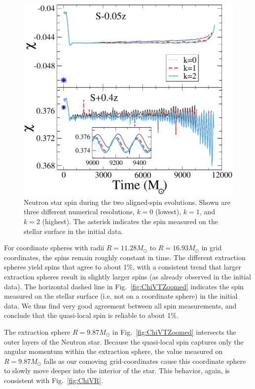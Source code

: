 \documentclass[aps,prd,amsmath,floatfix
,twocolumn
,superscriptaddress,nofootinbib,showpacs]{revtex4-1}
\theoremstyle{plain} \newtheorem{thm}{Theorem} \newtheorem{lem}{Lemma}
\begin{document}
\begin{figure}
\includegraphics[width=0.99\columnwidth]{ChiVTDifferentRes2}
\caption{{\label{fig:ChiVTDifferentRes2}} Neutron star spin during the
two aligned-spin evolutions.  Shown are three different numerical resolutions, $k=0$ (lowest), $k=1$, and $k=2$ (highest). The asterisk indicates the spin measured on the stellar surface in the initial data.}
\end{figure}

For coordinate spheres with radii $R=11.28M_\odot$ to $R=16.93M_\odot$ in grid coordinates, the spins remain roughly
constant in time.  The different extraction spheres yield spins that
agree to about 1\%, with a consistent trend that larger extraction
spheres result in slightly larger spins (as already observed in the
initial data).  The horizontal dashed line in
Fig.~\ref{fig:ChiVTZoomed} indicates the spin measured on the stellar
surface (i.e. not on a coordinate sphere) in the
initial data.  We thus find very good agreement between all spin measurements, and conclude that the quasi-local spin is reliable to about 1\%. 

The extraction sphere $R=9.87M_\odot$ in Fig.~\ref{fig:ChiVTZoomed}
intersects the outer layers of the Neutron star.  Because the
quasi-local spin captures only the angular momentum within the
extraction sphere, the value measured on $R=9.87M_\odot$ falls as our
comoving grid-coordinates cause this coordinate sphere to slowly move
deeper into the interior of the star.  This behavior, again, is
consistent with Fig.~\ref{fig:ChiVR}.
\end{document}
